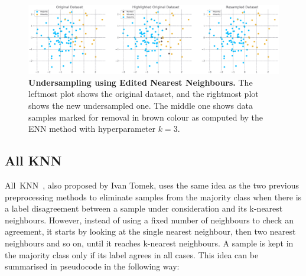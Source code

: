 \begin{figure}
    \centering
    \includegraphics[width=\linewidth]{figures/enn.eps}
    \caption{
        \textbf{Undersampling using Edited Nearest Neighbours.} The leftmost plot shows the
        original dataset, and the rightmost plot shows the new undersampled one. The middle one
        shows data samples marked for removal in brown colour as computed by the ENN method with
        hyperparameter $k = 3$.
    }
    \label{figure:enn}
\end{figure}


\subsection{All KNN}
\label{subsection:allknn}

All~KNN~\cite{repeated-enn}, also proposed by Ivan Tomek, uses the same idea as the two previous
preprocessing methods to eliminate samples from the majority class when there is a label
disagreement between a sample under consideration and its k-nearest neighbours. However, instead of
using a fixed number of neighbours to check an agreement, it starts by looking at the single
nearest neighbour, then two nearest neighbours and so on, until it reaches k-nearest neighbours. A
sample is kept in the majority class only if its label agrees in all cases. This idea can be
summarised in pseudocode in the following way:

